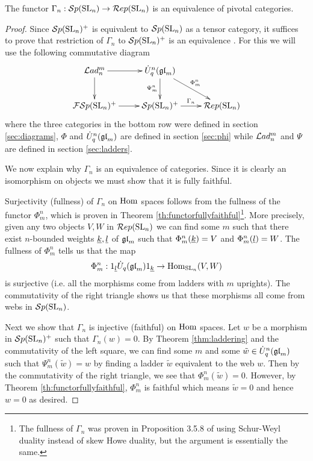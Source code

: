 \documentclass[10pt,leqno]{article}
\begin{document}
\begin{thm}\label{thm:main}
The functor $\Gamma_n: {\mathcal{S}p}({\rm{SL}}_n) \rightarrow \mathcal{R}ep({\rm{SL}}_n)$ is an equivalence of pivotal categories.
\end{thm}
\begin{proof}
Since ${\mathcal{S}p}({\rm{SL}}_n)^+ $ is equivalent to $ {\mathcal{S}p}({\rm{SL}}_n) $ as a tensor category, it suffices to prove that restriction of $ \Gamma_n $ to $ {\mathcal{S}p}({\rm{SL}}_n)^+ $ is an equivalence . For this we will use the following commutative diagram
\begin{equation}\label{diag:main}
\xymatrix{
\Lad_n^m \ar[r] \ar[d] & \dU^n(\gl_m) \ar[dr]^{\Phi_m^n} \ar[d]_{\Psi_m^n} & \\
\FSp(\SL_n)^+ \ar[r] & \Sp(\SL_n)^+ \ar[r]^{\Gamma_n} & \Rep(\SL_n) \\
}
\end{equation}
where the three categories in the bottom row were defined in section \ref{sec:diagrams}, $\Phi$ and $\dot{{{U}}}_q^n({\mathfrak{gl}}_m)$ are defined in section \ref{sec:phi} while $\mathcal{L}ad_n^m$ and $\Psi$ are defined in section \ref{sec:ladders}.

We now explain why $\Gamma_n$ is an equivalence of categories. Since it is clearly an isomorphism on objects we must show that it is fully faithful.

Surjectivity (fullness) of $\Gamma_n$ on $\operatorname{Hom}$ spaces follows from the fullness of the functor $ \Phi^n_m $, which is proven in Theorem \ref{th:functorfullyfaithful}\footnote{The fullness of $\Gamma_n$ was proven in Proposition 3.5.8 of \cite{0704.1503} using Schur-Weyl duality instead of skew Howe duality, but the argument is essentially the same.}.  More precisely, given any two objects $ V, W $ in $\mathcal{R}ep({\rm{SL}}_n) $ we can find some $m$ such that there exist $ n$-bounded weights $ {\underline{k}}, {\underline{l}} $ of $ {\mathfrak{gl}}_m$ such that $\Phi^n_m({\underline{k}}) = V$ and $\Phi^n_m({\underline{l}}) = W $. The fullness of $ \Phi^n_m $ tells us that the map
$$ \Phi^n_m : 1_{{\underline{l}}} \dot{{{U}}}_q({\mathfrak{gl}}_m) 1_{{\underline{k}}} \rightarrow \operatorname{Hom}_{{\rm{SL}}_n}(V, W) $$
is surjective (i.e. all the morphisms come from ladders with $m$ uprights). The commutativity of the right triangle shows us that these morphisms all come from webs in $ {\mathcal{S}p}({\rm{SL}}_n) $.

Next we show that $ \Gamma_n $ is injective (faithful) on $ \operatorname{Hom}$ spaces.  Let $w$ be a morphism in $ {\mathcal{S}p}({\rm{SL}}_n)^+ $ such that $\Gamma_n(w)=0$.  By Theorem \ref{thm:laddering} and the commutativity of the left square, we can find some $ m $ and some $\tilde{w} \in \dot{{{U}}}_q^n({\mathfrak{gl}}_m) $ such that $ \Psi^n_m(\tilde{w}) = w $ by finding a ladder $ \tilde{w} $ equivalent to the web $ w $. Then by the commutativity of the right triangle, we see that $ \Phi^n_m(\tilde{w}) = 0 $.  However, by Theorem \ref{th:functorfullyfaithful}, $\Phi_m^n$ is faithful which means $\tilde{w}=0$ and hence $w=0$ as desired.
\end{proof}
\end{document}

